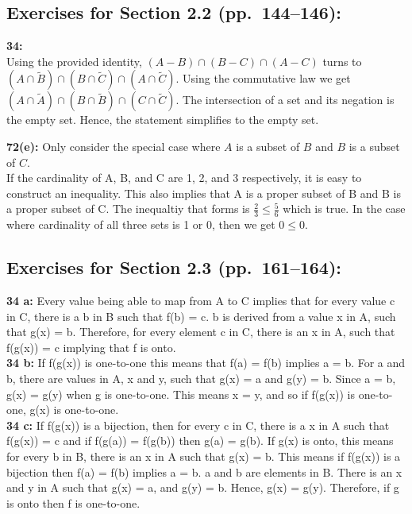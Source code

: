 \documentclass[12pt]{article}  %
\begin{document}

\subsection*{Exercises for Section 2.2 (pp.\ 144--146):}     

\noindent
{\bf 34:}
\\
Using the provided identity, $(A-B) \cap (B-C) \cap (A-C)$ turns to 
$ (A \cap \widetilde B) \cap (B \cap \widetilde C) \cap (A \cap \widetilde C)$. 
Using the commutative law we get $ (A \cap \widetilde A) \cap (B \cap \widetilde B) \cap (C \cap \widetilde C)$.
The intersection of a set and its negation is the empty set.
Hence, the statement simplifies to the empty set.

\noindent
{\bf 72(e):}  Only consider the special case where $A$ is a subset of $B$
and $B$ is a subset of $C$.
\\
If the cardinality of A, B, and C are 1, 2, and 3 respectively, it is easy to construct
an inequality. This also implies that A is a proper subset of B and B is a proper
subset of C. The inequaltiy that forms is $\frac{2}{3} \le \frac{5}{6}$ which is true.
In the case where cardinality of all three sets is 1 or 0, then we get $0 \le 0$.


\subsection*{Exercises for Section 2.3 (pp.\ 161--164):}     

\noindent
{\bf 34 a:} Every value being able to map from A to C implies 
that for every value c in C, there is a b in B such that 
f(b) = c. b is derived from a value x in A, such that g(x) = b. Therefore, for every
element c in C, there is an x in A, such that f(g(x)) = c implying that f is onto.
\\
{\bf 34 b:} If f(g(x)) is one-to-one this means that f(a) = f(b) implies a = b. 
For a and b, there are values in A, x and y, such that g(x) = a and g(y) = b. Since
a = b, g(x) = g(y) when g is one-to-one. This means x = y, and so if f(g(x)) is one-to-one, g(x) is one-to-one.
\\
{\bf 34 c:} If f(g(x)) is a bijection, then for every c in C, there is a x in A such 
that f(g(x)) = c and if f(g(a)) = f(g(b)) then g(a) = g(b). If g(x) is onto, this 
means for every b in B, there is an x in A such that g(x) = b. This means if f(g(x))
is a bijection then f(a) = f(b) implies a = b. a and b are elements in B. There is 
an x and y in A such that g(x) = a, and g(y) = b. Hence, g(x) = g(y). Therefore, if 
g is onto then f is one-to-one.
\end{document}
